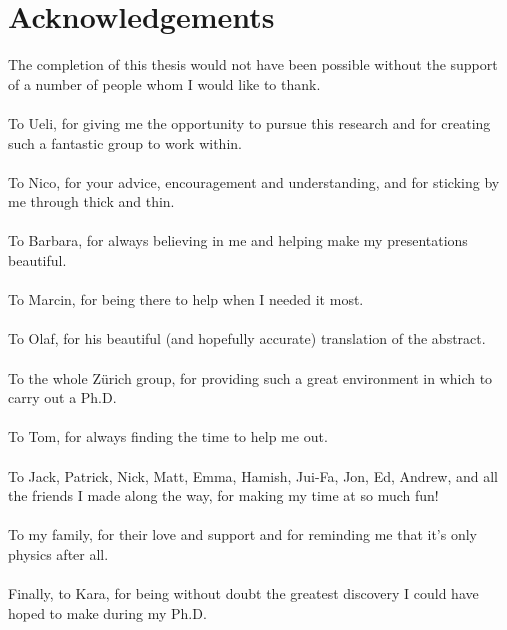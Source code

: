 \section*{Acknowledgements}

The completion of this thesis would not have been possible without the support of a number of people whom I would like to thank.\\~\\
To Ueli, for giving me the opportunity to pursue this research and for creating such a fantastic group to work within. \\~\\
To Nico, for your advice, encouragement and understanding, and for sticking by me through thick and thin. \\~\\
To Barbara, for always believing in me and helping make my presentations beautiful. \\~\\
To Marcin, for being there to help when I needed it most. \\~\\
To Olaf, for his beautiful (and hopefully accurate) translation of the abstract. \\~\\
To the whole Z\"urich \lhcb group, for providing such a great environment in which to carry out a Ph.D. \\~\\
To Tom, for always finding the time to help me out. \\~\\
To Jack, Patrick, Nick, Matt, Emma, Hamish, Jui-Fa, Jon, Ed, Andrew, and all the friends I made along the way, for making my time at \cern so much fun!  \\~\\
To my family, for their love and support and for reminding me that it's only physics after all. \\~\\
Finally, to Kara, for being without doubt the greatest discovery I could have hoped to make during my Ph.D.